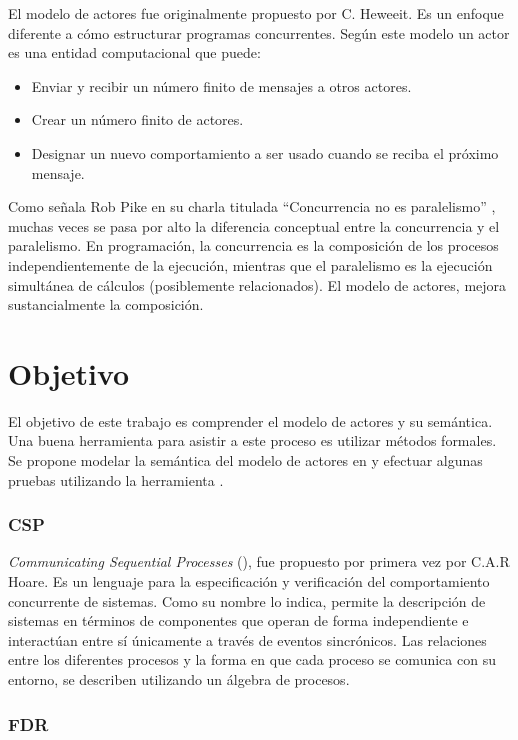 El modelo de actores fue originalmente propuesto por C. Heweeit\cite{Wyatt:2013:AC:2663429}. Es un enfoque diferente a cómo estructurar programas concurrentes. Según este modelo un actor es una entidad computacional que puede:

\begin{itemize}
\item Enviar y recibir un número finito de mensajes a otros actores.
\item Crear un número finito de actores.
\item Designar un nuevo comportamiento a ser usado cuando se reciba el próximo mensaje.
\end{itemize}

Como señala Rob Pike en su charla titulada ``Concurrencia no es paralelismo'' \cite{rpike13:cnp}, muchas veces se pasa por alto la diferencia conceptual entre la concurrencia y el paralelismo. En programación, la concurrencia es la composición de los procesos independientemente de la ejecución, mientras que el paralelismo es la ejecución simultánea de cálculos (posiblemente relacionados). El modelo de actores, mejora sustancialmente la composición.

\section{Objetivo}
El objetivo de este trabajo es comprender el modelo de actores y su semántica. Una buena herramienta para asistir a este proceso es utilizar métodos formales. Se propone modelar la semántica del modelo de actores en \CSP y efectuar algunas pruebas utilizando la herramienta \FDR\cite{fdr}.

\subsubsection*{CSP}

\textit{Communicating Sequential Processes} (\CSP), fue propuesto por primera vez por C.A.R Hoare\cite{Hoare:1978:CSP:359576.359585}. Es un lenguaje para la especificación y verificación del comportamiento concurrente de sistemas. Como su nombre lo indica, \CSP permite la descripción de sistemas en términos de componentes que operan de forma independiente e interactúan entre sí únicamente a través de eventos sincrónicos. Las relaciones entre los diferentes procesos y la forma en que cada proceso se comunica con su entorno, se describen utilizando un álgebra de procesos.

\subsubsection*{FDR}

